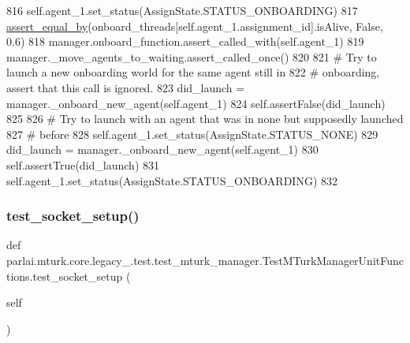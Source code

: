\begin{DoxyCode}
816         self.agent\_1.set\_status(AssignState.STATUS\_ONBOARDING)
817         \hyperlink{namespaceparlai_1_1mturk_1_1core_1_1test_1_1test__mturk__manager_a1fd7ac4fedefa65d2416601107dbe44c}{assert\_equal\_by}(onboard\_threads[self.agent\_1.assignment\_id].isAlive, \textcolor{keyword}{False}, 0.6)
818         manager.onboard\_function.assert\_called\_with(self.agent\_1)
819         manager.\_move\_agents\_to\_waiting.assert\_called\_once()
820 
821         \textcolor{comment}{# Try to launch a new onboarding world for the same agent still in}
822         \textcolor{comment}{# onboarding, assert that this call is ignored.}
823         did\_launch = manager.\_onboard\_new\_agent(self.agent\_1)
824         self.assertFalse(did\_launch)
825 
826         \textcolor{comment}{# Try to launch with an agent that was in none but supposedly launched}
827         \textcolor{comment}{# before}
828         self.agent\_1.set\_status(AssignState.STATUS\_NONE)
829         did\_launch = manager.\_onboard\_new\_agent(self.agent\_1)
830         self.assertTrue(did\_launch)
831         self.agent\_1.set\_status(AssignState.STATUS\_ONBOARDING)
832 
\end{DoxyCode}
\mbox{\label{classparlai_1_1mturk_1_1core_1_1legacy__2018_1_1test_1_1test__mturk__manager_1_1TestMTurkManagerUnitFunctions_ab969d9af358ec229a18f883b751e7dd4}} 
\subsubsection{\texorpdfstring{test\+\_\+socket\+\_\+setup()}{test\_socket\_setup()}}
{\footnotesize\ttfamily def parlai.\+mturk.\+core.\+legacy\+\_.\+test.\+test\+\_\+mturk\+\_\+manager.\+Test\+M\+Turk\+Manager\+Unit\+Functions.\+test\+\_\+socket\+\_\+setup (\begin{DoxyParamCaption}\item[{}]{self }\end{DoxyParamCaption})}

